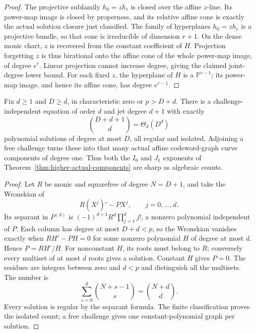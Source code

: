 \begin{proof}
The projective subfamily $h_0=zh_r$ is closed over the affine
$z$-line. Its power-map image is closed by properness, and its
relative affine cone is exactly the actual solution closure just
classified. The family of hyperplanes $h_0=zh_r$ is a projective
bundle, so that cone is irreducible of dimension $r+1$. On the dense
monic chart, $z$ is recovered from the constant coefficient of $H$.
Projection forgetting $z$ is thus birational onto the affine cone
of the whole power-map image, of degree $e^r$. Linear projection
cannot increase degree, giving the claimed joint-degree lower bound.
For each fixed $z$, the hyperplane of $H$ is a $\mathbb P^{r-1}$;
its power-map image, and hence its affine cone, has degree $e^{r-1}$.
\end{proof}

\begin{proposition}
\label{prop:fixed-fiber-isolated-sharpness}
Fix $d\ge1$ and $D\ge d$, in characteristic zero or $p>D+d$.
There is a challenge-independent equation of order $d$ and jet
degree $d+1$ with exactly
\[
 \binom{D+d+1}{d}=\Theta_d(D^d)
\]
polynomial solutions of degree at most $D$, all regular and isolated.
Adjoining a free challenge turns these into that many actual affine
codeword-graph curve components of degree one. Thus both the $I_0$
and $J_1$ exponents of Theorem~\ref{thm:higher-actual-components}
are sharp as algebraic counts.
\end{proposition}
\begin{proof}
Let $R$ be monic and squarefree of degree $N=D+1$, and take the
Wronskian of
\[
 R(X^j)'-PX^j,\qquad j=0,\ldots,d.
\]
Its separant in $P^{(d)}$ is
$(-1)^{d+1}R^d\prod_{j=1}^d j!$, a nonzero polynomial independent
of $P$. Each column has degree at most $D+d<p$, so the Wronskian
vanishes exactly when $RH'-PH=0$ for some nonzero polynomial
$H$ of degree at most $d$. Hence $P=RH'/H$. For nonconstant $H$,
its roots must belong to $R$; conversely every multiset of at most
$d$ roots gives a solution. Constant $H$ gives $P=0$. The residues
are integers between zero and $d<p$ and distinguish all the multisets.
The number is
\[
 \sum_{s=0}^d\binom{N+s-1}{s}=\binom{N+d}{d}.
\]
Every solution is regular by the separant formula. The finite
classification proves the isolated count; a free challenge gives
one constant-polynomial graph per solution.
\end{proof}

